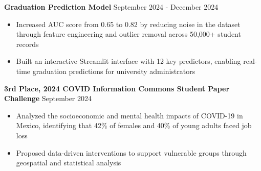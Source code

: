 \documentclass[a4paper]{article}
\begin{document}
\textbf{Graduation Prediction Model}
\hfill{September 2024 - December 2024}
\begin{itemize}[noitemsep]
    \item Increased AUC score from 0.65 to 0.82 by reducing noise in the dataset through feature 
    engineering and outlier removal across 50,000+ student records
    \item Built an interactive Streamlit interface with 12 key predictors, enabling 
    real-time graduation predictions for university administrators
\end{itemize}

\textbf{3rd Place, 2024 COVID Information Commons Student Paper Challenge} \hfill{September 2024}
    \begin{itemize}[noitemsep]
        \item Analyzed the socioeconomic and mental health impacts of COVID-19 in Mexico, identifying that 42\% of females and 40\% of young adults faced job loss
        \item Proposed data-driven interventions to support vulnerable groups through geospatial and statistical analysis
    \end{itemize}



\end{document}
